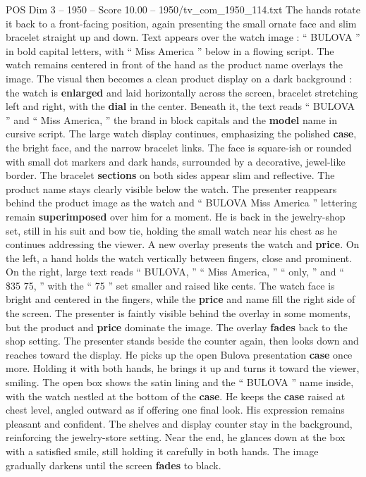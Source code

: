 \begin{textsample}{POS Dim 3 – 1950 – Score 10.00 – 1950/tv\_com\_1950\_114.txt}
The hands rotate it back to a front-facing position, again presenting the small ornate face and slim bracelet straight up and down.
Text appears over the watch image : “ BULOVA ” in bold capital letters, with “ Miss America ” below in a flowing script.
The watch remains centered in front of the hand as the product name overlays the image.
The visual then becomes a clean product display on a dark background : the watch is \textbf{enlarged} and laid horizontally across the screen, bracelet stretching left and right, with the \textbf{dial} in the center.
Beneath it, the text reads “ BULOVA ” and “ Miss America, ” the brand in block capitals and the \textbf{model} name in cursive script.
The large watch display continues, emphasizing the polished \textbf{case}, the bright face, and the narrow bracelet links.
The face is square-ish or rounded with small dot markers and dark hands, surrounded by a decorative, jewel-like border.
The bracelet \textbf{sections} on both sides appear slim and reflective.
The product name stays clearly visible below the watch.
The presenter reappears behind the product image as the watch and “ BULOVA Miss America ” lettering remain \textbf{superimposed} over him for a moment.
He is back in the jewelry-shop set, still in his suit and bow tie, holding the small watch near his chest as he continues addressing the viewer.
A new overlay presents the watch and \textbf{price}.
On the left, a hand holds the watch vertically between fingers, close and prominent.
On the right, large text reads “ BULOVA, ” “ Miss America, ” “ only, ” and “ \$35 75, ” with the “ 75 ” set smaller and raised like cents.
The watch face is bright and centered in the fingers, while the \textbf{price} and name fill the right side of the screen.
The presenter is faintly visible behind the overlay in some moments, but the product and \textbf{price} dominate the image.
The overlay \textbf{fades} back to the shop setting.
The presenter stands beside the counter again, then looks down and reaches toward the display.
He picks up the open Bulova presentation \textbf{case} once more.
Holding it with both hands, he brings it up and turns it toward the viewer, smiling.
The open box shows the satin lining and the “ BULOVA ” name inside, with the watch nestled at the bottom of the \textbf{case}.
He keeps the \textbf{case} raised at chest level, angled outward as if offering one final look.
His expression remains pleasant and confident.
The shelves and display counter stay in the background, reinforcing the jewelry-store setting.
Near the end, he glances down at the box with a satisfied smile, still holding it carefully in both hands.
The image gradually darkens until the screen \textbf{fades} to black.

\end{textsample}
